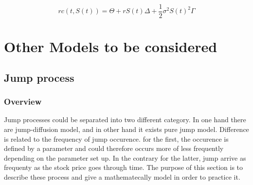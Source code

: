 \documentclass[12pt]{report}
\newcommand{\call}[2]{c\left( #1, #2\right)}
\newcommand{\St}{S\left(t\right)}
\newcommand{\BSMGreeks}[1]{r\call{t}{#1} = \Theta + r #1 \Delta + \frac{1}{2} \sigma ^2 #1 ^2 \Gamma}
\begin{document}
\begin{center}
  \begin{equation}
    \BSMGreeks{\St}
    \label{eq:BSMGreeks}
  \end{equation}
\end{center}






























%
%
\chapter{Other Models to be considered}
\label{cha:OtherModel}


\section{Jump process}
\label{sec:Jump}

\subsection{Overview}
\label{sub:OverviewJump}
Jump processes could be separated into two different category. 
In one hand there are jump-diffusion model, and in other hand it exists pure jump model.
Difference is related to the frequency of jump occurence. for the first, the occurence is defined by a parameter and could therefore occurs more of less frequently depending on the parameter set up.
In the contrary for the latter, jump arrive as frequenty as the stock price goes through time.
The purpose of this section is to describe these process and give a mathematecally model in order to practice it.
\end{document}
